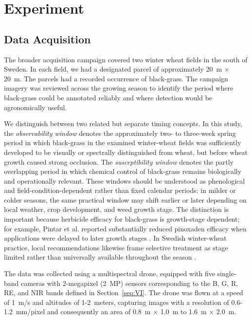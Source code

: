 \documentclass{ieeeaccess}
\begin{document}
\section{Experiment}

\subsection{Data Acquisition}
The broader acquisition campaign covered two winter wheat fields in the south of Sweden. In each field, we had a designated parcel of approximately 20~m $\times$ 20~m. The parcels had a recorded occurrence of black-grass. The campaign imagery was reviewed across the growing season to identify the period where black-grass could be annotated reliably and where detection would be agronomically useful.

We distinguish between two related but separate timing concepts. In this study, the \emph{observability window} denotes the approximately two- to three-week spring period in which black-grass in the examined winter-wheat fields was sufficiently developed to be visually or spectrally distinguished from wheat, but before wheat growth caused strong occlusion. The \emph{susceptibility window} denotes the partly overlapping period in which chemical control of black-grass remains biologically and operationally relevant. These windows should be understood as phenological and field-condition-dependent rather than fixed calendar periods: in milder or colder seasons, the same practical window may shift earlier or later depending on local weather, crop development, and weed growth stage. The distinction is important because herbicide efficacy for black-grass is growth-stage dependent; for example, Pintar et al. reported substantially reduced pinoxaden efficacy when applications were delayed to later growth stages \cite{pintar_growth_stage_2021}. In Swedish winter-wheat practice, local recommendations likewise frame selective treatment as stage limited rather than universally available throughout the season \cite{renkavle}.

The data was collected using a multispectral drone, equipped with five single-band cameras with 2-megapixel (2~MP) sensors corresponding to the B, G, R, RE, and NIR bands defined in Section~\ref{seq:VI}. The drone was flown at a speed of 1~m/s and altitudes of 1-2~meters, capturing images with a resolution of 0.6-1.2~mm/pixel and consequently an area of 0.8~m $\times$ 1.0~m to 1.6~m $\times$ 2.0~m. 
\end{document}
